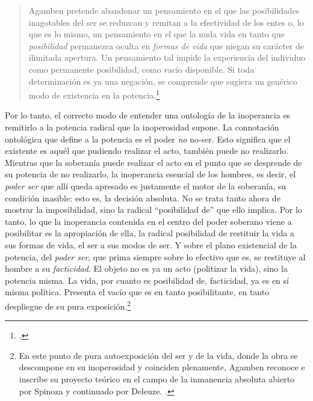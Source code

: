\begin{quote}
Agamben pretende abandonar un pensamiento en el que las posibilidades inagotables del ser se reduzcan y remitan a la efectividad de los entes o, lo que es lo mismo, un pensamiento en el que la nuda vida en tanto que \emph{posibilidad} permanezca oculta en \emph{formas de vida} que niegan su carácter de ilimitada apertura. Un pensamiento tal impide la experiencia del individuo como permanente posibilidad, como vacío disponible. Si toda determinación es ya una negación, se comprende que sugiera un genérico modo de existencia en la potencia.\footcite[Véase][207]{@7088-GALINDOHERVAS2003}
\end{quote}

Por lo tanto, el correcto modo de entender una ontología de la inoperancia es remitirlo a la potencia radical que la inoperosidad supone. La connotación ontológica que define a la potencia es el poder \emph{no} no-ser. Esto significa que el existente es aquél que pudiendo realizar el acto, también puede no realizarlo. Mientras que la soberanía puede realizar el acto en el punto que se desprende de su potencia de no realizarlo, la inoperancia esencial de los hombres, es decir, el \emph{poder ser} que allí queda apresado es justamente el motor de la soberanía, su condición inasible: esto es, la decisión absoluta. No se trata tanto ahora de mostrar la imposibilidad, sino la radical \enquote{posibilidad de} que ello implica. Por lo tanto, lo que la inoperancia contenida en el centro del poder soberano viene a posibilitar es la apropiación de ella, la radical posibilidad de restituir la vida a sus formas de vida, el ser a sus modos de ser. Y sobre el plano existencial de la potencia, del \emph{poder ser}, que prima siempre sobre lo efectivo que es, se restituye al hombre a su \emph{facticidad}. El objeto no es ya un acto (politizar la vida), sino la potencia misma. La vida, por cuanto es posibilidad de, facticidad, ya es en sí misma política. Presenta el vacío que es en tanto posibilitante, en tanto despliegue de su pura exposición.\footnote{En este punto de pura autoexposición del ser y de la vida, donde la obra se descompone en su inoperosidad y coinciden plenamente, Agamben reconoce e inscribe su proyecto teórico en el campo de la inmanencia absoluta abierto por Spinoza y continuado por Deleuze. \cite[][85]{@7099-DELEUZE2007}.}

